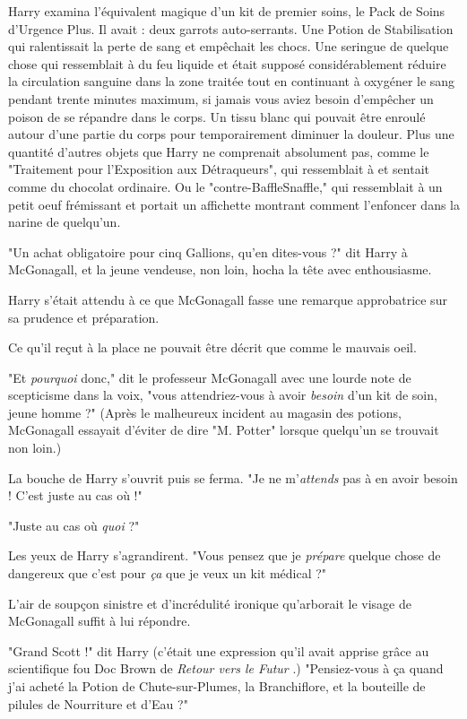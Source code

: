 Harry examina l'équivalent magique d'un kit de premier soins, le Pack de Soins d'Urgence Plus. Il avait : deux garrots auto-serrants. Une Potion de Stabilisation qui ralentissait la perte de sang et empêchait les chocs. Une seringue de quelque chose qui ressemblait à du feu liquide et était supposé considérablement réduire la circulation sanguine dans la zone traitée tout en continuant à oxygéner le sang pendant trente minutes maximum, si jamais vous aviez besoin d'empêcher un poison de se répandre dans le corps. Un tissu blanc qui pouvait être enroulé autour d'une partie du corps pour temporairement diminuer la douleur. Plus une quantité d'autres objets que Harry ne comprenait absolument pas, comme le "Traitement pour l'Exposition aux Détraqueurs", qui ressemblait à et sentait comme du chocolat ordinaire. Ou le "contre-BaffleSnaffle," qui ressemblait à un petit oeuf frémissant et portait un affichette montrant comment l'enfoncer dans la narine de quelqu'un.

"Un achat obligatoire pour cinq Gallions, qu'en dites-vous ?" dit Harry à McGonagall, et la jeune vendeuse, non loin, hocha la tête avec enthousiasme.

Harry s'était attendu à ce que McGonagall fasse une remarque approbatrice sur sa prudence et préparation.

Ce qu'il reçut à la place ne pouvait être décrit que comme le mauvais oeil.

"Et \emph{pourquoi}  donc," dit le professeur McGonagall avec une lourde note de scepticisme dans la voix, "vous attendriez-vous à avoir \emph{besoin}  d'un kit de soin, jeune homme ?" (Après le malheureux incident au magasin des potions, McGonagall essayait d'éviter de dire "M. Potter" lorsque quelqu'un se trouvait non loin.)

La bouche de Harry s'ouvrit puis se ferma. "Je ne m'\emph{attends}  pas à en avoir besoin ! C'est juste au cas où !"

"Juste au cas où \emph{quoi}  ?"

Les yeux de Harry s'agrandirent. "Vous pensez que je \emph{prépare}  quelque chose de dangereux que c'est pour \emph{ça}  que je veux un kit médical ?"

L'air de soupçon sinistre et d'incrédulité ironique qu'arborait le visage de McGonagall suffit à lui répondre.

"Grand Scott !" dit Harry (c'était une expression qu'il avait apprise grâce au scientifique fou Doc Brown de \emph{Retour vers le Futur} .) "Pensiez-vous à ça quand j'ai acheté la Potion de Chute-sur-Plumes, la Branchiflore, et la bouteille de pilules de Nourriture et d'Eau ?"

